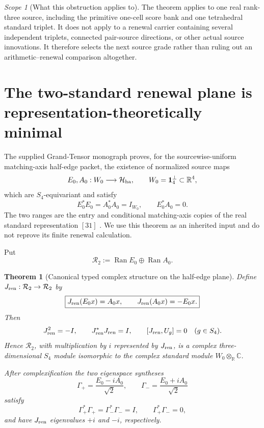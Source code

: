 \documentclass[11pt]{article}
\newtheorem{theorem}{Theorem}[section]
\theoremstyle{definition}
\theoremstyle{remark}
\newtheorem{scope}[scope]{Scope}
\newcommand{\C}{\mathbb C}
\newcommand{\R}{\mathbb R}
\newcommand{\one}{\mathbf1}
\begin{document}
\begin{scope}[What this obstruction applies to]
The theorem applies to one real rank-three source, including the primitive
one-cell score bank and one tetrahedral standard triplet.  It does not apply
to a renewal carrier containing several independent triplets, connected
pair-source directions, or other actual source innovations.  It therefore
selects the next source grade rather than ruling out an arithmetic--renewal
comparison altogether.
\end{scope}

\section{The two-standard renewal plane is representation-theoretically minimal}
\label{sec:v14-two-standard}

The supplied Grand-Tensor monograph proves, for the sourcewise-uniform
matching-axis half-edge packet, the existence of normalized source maps
\[
 E_0,A_0:W_0\longrightarrow\mathcal H_{\rm ha},
 \qquad W_0=\one_4^\perp\subset\R^4,
\]
which are $S_4$-equivariant and satisfy
\begin{equation}
 \boxed{
 E_0^*E_0=A_0^*A_0=I_{W_0},
 \qquad E_0^*A_0=0.}
 \label{eq:v14-inherited-EA}
\end{equation}
The two ranges are the entry and conditional matching-axis copies of the real
standard representation $[31]$ \cite{GT77}.  We use this theorem as an
inherited input and do not reprove its finite renewal calculation.

Put
\[
 \mathcal R_2:=\operatorname{Ran} E_0\oplus\operatorname{Ran} A_0.
\]

\begin{theorem}[Canonical typed complex structure on the half-edge plane]
\label{thm:v14-renewal-complex-structure}
Define $J_{\rm ren}:\mathcal R_2\to\mathcal R_2$ by
\begin{equation}
 \boxed{
 J_{\rm ren}(E_0x)=A_0x,
 \qquad
 J_{\rm ren}(A_0x)=-E_0x.}
 \label{eq:v14-Jren}
\end{equation}
Then
\[
 J_{\rm ren}^2=-I,
 \qquad J_{\rm ren}^*J_{\rm ren}=I,
 \qquad [J_{\rm ren},U_g]=0\quad(g\in S_4).
\]
Hence $\mathcal R_2$, with multiplication by $i$ represented by
$J_{\rm ren}$, is a complex three-dimensional $S_4$ module isomorphic to the
complex standard module $W_0\otimes_\R\C$.

After complexification the two eigenspace syntheses
\begin{equation}
 \boxed{
 \Gamma_+=\frac{E_0-iA_0}{\sqrt2},
 \qquad
 \Gamma_- =\frac{E_0+iA_0}{\sqrt2}}
 \label{eq:v14-chiral-sources}
\end{equation}
satisfy
\[
 \Gamma_+^*\Gamma_+=\Gamma_-^*\Gamma_-=I,
 \qquad
 \Gamma_+^*\Gamma_-=0,
\]
and have $J_{\rm ren}$ eigenvalues $+i$ and $-i$, respectively.
\end{theorem}
\end{document}
